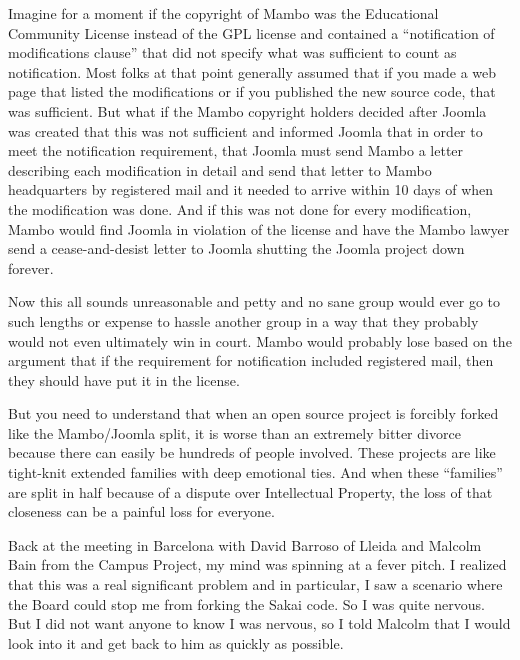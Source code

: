 \documentclass[12pt]{book}
\begin{document}
Imagine for a moment if the copyright of Mambo
was the Educational Community License instead
of the GPL license and contained a ``notification
of modifications clause'' that did not specify
what was sufficient to count as notification.
Most folks at that point generally assumed that
if you made a web page that listed the modifications
or if you published the new source code,
that was sufficient.  But what if the Mambo
copyright holders decided after Joomla was created
that this was not sufficient and informed Joomla
that in order to meet the notification requirement,
that Joomla must send Mambo a letter describing
each modification in detail and send that letter
to Mambo headquarters by registered mail and it
needed to arrive within 10 days of when the
modification was done.  And if this was not done
for every modification, Mambo would find Joomla
in violation of the license and have the Mambo
lawyer send a cease-and-desist letter to Joomla
shutting the Joomla project down forever.

Now this all sounds unreasonable and
petty and no sane group would ever go to such
lengths or expense to hassle another group
in a way that they probably would not even
ultimately win in court.  Mambo would probably
lose based on the argument that if the requirement
for notification included registered mail, then
they should have put it in the license.

But you need to understand that when an open
source project
is forcibly forked like the Mambo\slash Joomla split,
it is worse than an extremely bitter divorce because
there can easily be hundreds of people involved.
These projects are like tight-knit extended families
with deep emotional ties.  And when
these ``families'' are split in half because of
a dispute over Intellectual Property, the loss
of that closeness can be a painful loss
for everyone.

Back at the meeting in Barcelona with
David Barroso of Lleida and
Malcolm Bain from the Campus Project, my mind
was spinning at a fever pitch.  I realized
that this was a real significant problem and
in particular, I saw a scenario where the Board
could stop me from forking the Sakai code.
So I was quite nervous.  But I did not want
anyone to know I was nervous, so I told
Malcolm that I would look into it and get back
to him as quickly as possible.
\end{document}
